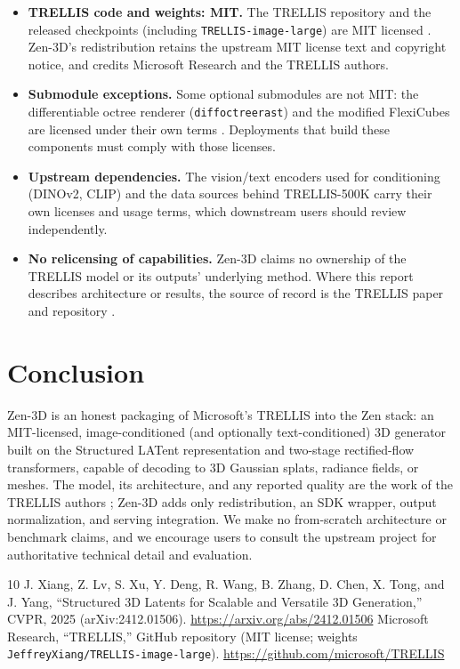 \documentclass[11pt,a4paper]{article}
\begin{document}
\begin{itemize}
    \item \textbf{TRELLIS code and weights: MIT.} The TRELLIS repository and the released
    checkpoints (including \texttt{TRELLIS-image-large}) are MIT licensed
    \cite{trellis_repo}. Zen-3D's redistribution retains the upstream MIT license text and
    copyright notice, and credits Microsoft Research and the TRELLIS authors.
    \item \textbf{Submodule exceptions.} Some optional submodules are not MIT: the
    differentiable octree renderer (\texttt{diffoctreerast}) and the modified FlexiCubes are
    licensed under their own terms \cite{trellis_repo}. Deployments that build these components
    must comply with those licenses.
    \item \textbf{Upstream dependencies.} The vision/text encoders used for conditioning
    (DINOv2, CLIP) and the data sources behind TRELLIS-500K carry their own licenses and
    usage terms, which downstream users should review independently.
    \item \textbf{No relicensing of capabilities.} Zen-3D claims no ownership of the TRELLIS
    model or its outputs' underlying method. Where this report describes architecture or
    results, the source of record is the TRELLIS paper and repository
    \cite{xiang2024trellis,trellis_repo}.
\end{itemize}

\section{Conclusion}

Zen-3D is an honest packaging of Microsoft's TRELLIS into the Zen stack: an MIT-licensed,
image-conditioned (and optionally text-conditioned) 3D generator built on the Structured LATent
representation and two-stage rectified-flow transformers, capable of decoding to 3D Gaussian
splats, radiance fields, or meshes. The model, its architecture, and any reported quality are
the work of the TRELLIS authors \cite{xiang2024trellis}; Zen-3D adds only redistribution, an SDK
wrapper, output normalization, and serving integration. We make no from-scratch architecture or
benchmark claims, and we encourage users to consult the upstream project for authoritative
technical detail and evaluation.

\begin{thebibliography}{10}
 J. Xiang, Z. Lv, S. Xu, Y. Deng, R. Wang, B. Zhang, D. Chen, X. Tong, and J. Yang, ``Structured 3D Latents for Scalable and Versatile 3D Generation,'' CVPR, 2025 (arXiv:2412.01506). \url{https://arxiv.org/abs/2412.01506}
 Microsoft Research, ``TRELLIS,'' GitHub repository (MIT license; weights \texttt{JeffreyXiang/TRELLIS-image-large}). \url{https://github.com/microsoft/TRELLIS}
\end{thebibliography}
\end{document}
